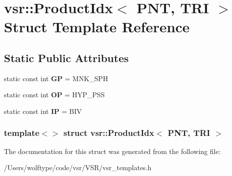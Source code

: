 \hypertarget{structvsr_1_1_product_idx_3_01_p_n_t_00_01_t_r_i_01_4}{\section{vsr\-:\-:Product\-Idx$<$ P\-N\-T, T\-R\-I $>$ Struct Template Reference}
\label{structvsr_1_1_product_idx_3_01_p_n_t_00_01_t_r_i_01_4}
}
\subsection*{Static Public Attributes}
\begin{DoxyCompactItemize}
\item 
\hypertarget{structvsr_1_1_product_idx_3_01_p_n_t_00_01_t_r_i_01_4_a4e06eacb4bfb2e6f9d0f62ae1043fc85}{static const int {\bfseries G\-P} = M\-N\-K\-\_\-\-S\-P\-H}\label{structvsr_1_1_product_idx_3_01_p_n_t_00_01_t_r_i_01_4_a4e06eacb4bfb2e6f9d0f62ae1043fc85}

\item 
\hypertarget{structvsr_1_1_product_idx_3_01_p_n_t_00_01_t_r_i_01_4_a3edd7bd96e308dce3a112124f792be4b}{static const int {\bfseries O\-P} = H\-Y\-P\-\_\-\-P\-S\-S}\label{structvsr_1_1_product_idx_3_01_p_n_t_00_01_t_r_i_01_4_a3edd7bd96e308dce3a112124f792be4b}

\item 
\hypertarget{structvsr_1_1_product_idx_3_01_p_n_t_00_01_t_r_i_01_4_a935e83413cb1a5f35601b54ed2506793}{static const int {\bfseries I\-P} = B\-I\-V}\label{structvsr_1_1_product_idx_3_01_p_n_t_00_01_t_r_i_01_4_a935e83413cb1a5f35601b54ed2506793}

\end{DoxyCompactItemize}
\subsubsection*{template$<$$>$ struct vsr\-::\-Product\-Idx$<$ P\-N\-T, T\-R\-I $>$}



The documentation for this struct was generated from the following file\-:\begin{DoxyCompactItemize}
\item 
/\-Users/wolftype/code/vsr/\-V\-S\-R/vsr\-\_\-templates.\-h\end{DoxyCompactItemize}
